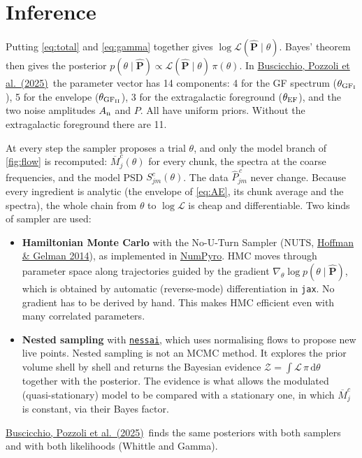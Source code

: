 \documentclass[11pt,a4paper]{article}
\newcommand{\urlPone}{https://arxiv.org/pdf/2511.03604}
\newcommand{\Pone}{\href{\urlPone}{Buscicchio, Pozzoli et al.~(2025)}}
\newcommand{\dd}{\mathrm{d}}
\newcommand{\Pbar}{\hat{P}}
\newcommand{\Mbar}{\overline{M}}
\begin{document}
\section{Inference}\label{sec:inference}

Putting \cref{eq:total} and \cref{eq:gamma} together gives
$\log\mathcal{L}(\boldsymbol{\Pbar}\mid\theta)$. Bayes' theorem then gives the
posterior
$p(\theta\mid\boldsymbol{\Pbar}) \propto \mathcal{L}(\boldsymbol{\Pbar}\mid\theta)\,\pi(\theta)$.
In \Pone\ the parameter vector has 14 components: 4 for the GF spectrum
($\theta_{\rm GF_I}$), 5 for the envelope ($\theta_{\rm GF_{II}}$), 3 for the
extragalactic foreground ($\theta_{\rm EF}$), and the two noise amplitudes
$A_{\rm n}$ and $P$. All have uniform priors. Without the extragalactic foreground
there are 11.

At every step the sampler proposes a trial $\theta$, and only the model branch of
\cref{fig:flow} is recomputed: $\Mbar^c_j(\theta)$ for every chunk, the spectra at
the coarse frequencies, and the model PSD $S^c_{jm}(\theta)$. The data
$\Pbar^{\,c}_{jm}$ never change. Because every ingredient is analytic (the envelope
of \cref{eq:AE}, its chunk average and the spectra), the whole chain from $\theta$
to $\log\mathcal{L}$ is cheap and differentiable. Two kinds of sampler are used:
\begin{itemize}
  \item \textbf{Hamiltonian Monte Carlo} with the No-U-Turn Sampler (NUTS,
        \href{https://arxiv.org/abs/1111.4246}{Hoffman \& Gelman 2014}), as
        implemented in \href{https://arxiv.org/abs/1912.11554}{NumPyro}. HMC moves
        through parameter space along trajectories guided by the gradient
        $\nabla_\theta\log p(\theta\mid\boldsymbol{\Pbar})$, which is obtained by
        automatic (reverse-mode) differentiation in \texttt{jax}. No gradient has to
        be derived by hand. This makes HMC efficient even with many correlated
        parameters.
  \item \textbf{Nested sampling} with
        \href{https://arxiv.org/abs/2102.11056}{\texttt{nessai}}, which uses
        normalising flows to propose new live points. Nested sampling is not an MCMC
        method. It explores the prior volume shell by shell and returns the Bayesian
        evidence $\mathcal{Z}=\int\mathcal{L}\,\pi\,\dd\theta$ together with the
        posterior. The evidence is what allows the modulated (quasi-stationary) model
        to be compared with a stationary one, in which $\Mbar^c_j$ is constant, via
        their Bayes factor.
\end{itemize}
\Pone\ finds the same posteriors with both samplers and with both likelihoods
(Whittle and Gamma).
\end{document}
